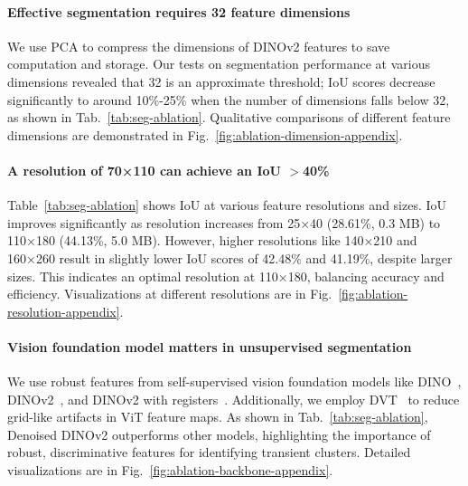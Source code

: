 \paragraph{Effective segmentation requires 32 feature dimensions} We use PCA to compress the dimensions of DINOv2 features to save computation and storage. Our tests on segmentation performance at various dimensions revealed that 32 is an approximate threshold; IoU scores decrease significantly to around 10\%-25\% when the number of dimensions falls below 32, as shown in Tab.~\ref{tab:seg-ablation}. Qualitative comparisons of different feature dimensions are demonstrated in Fig.~\ref{fig:ablation-dimension-appendix}.

\paragraph{A resolution of 70×110 can achieve an IoU $>$40\%} Table~\ref{tab:seg-ablation} shows IoU at various feature resolutions and sizes. IoU improves significantly as resolution increases from 25×40 (28.61\%, 0.3 MB) to 110×180 (44.13\%, 5.0 MB). However, higher resolutions like 140×210 and 160×260 result in slightly lower IoU scores of 42.48\% and 41.19\%, despite larger sizes. This indicates an optimal resolution at 110×180, balancing accuracy and efficiency. Visualizations at different resolutions are in Fig.~\ref{fig:ablation-resolution-appendix}.

\paragraph{Vision foundation model matters in unsupervised segmentation} We use robust features from self-supervised vision foundation models like DINO~\cite{caron2021emerging}, DINOv2~\cite{oquab2023dinov2}, and DINOv2 with registers~\cite{darcet2023vision}. Additionally, we employ DVT~\cite{yang2024denoising} to reduce grid-like artifacts in ViT feature maps. As shown in Tab.~\ref{tab:seg-ablation}, Denoised DINOv2 outperforms other models, highlighting the importance of robust, discriminative features for identifying transient clusters. Detailed visualizations are in Fig.~\ref{fig:ablation-backbone-appendix}.



